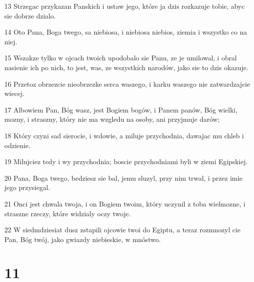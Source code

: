 \par 13 Strzegac przykazan Panskich i ustaw jego, które ja dzis rozkazuje tobie, abyc sie dobrze dzialo.
\par 14 Oto Pana, Boga twego, sa niebiosa, i niebiosa niebios, ziemia i wszystko co na niej.
\par 15 Wszakze tylko w ojcach twoich upodobalo sie Panu, ze je umilowal, i obral nasienie ich po nich, to jest, was, ze wszystkich narodów, jako sie to dzis okazuje.
\par 16 Przetoz obrzezcie nieobrzezke serca waszego, i karku waszego nie zatwardzajcie wiecej.
\par 17 Albowiem Pan, Bóg wasz, jest Bogiem bogów, i Panem panów, Bóg wielki, mozny, i straszny, który nie ma wzgledu na osoby, ani przyjmuje darów;
\par 18 Który czyni sad sierocie, i wdowie, a miluje przychodnia, dawajac mu chleb i odzienie.
\par 19 Milujciez tedy i wy przychodnia; boscie przychodniami byli w ziemi Egipskiej.
\par 20 Pana, Boga twego, bedziesz sie bal, jemu sluzyl, przy nim trwal, i przez imie jego przysiegal.
\par 21 Onci jest chwala twoja, i on Bogiem twoim, który uczynil z toba wielmozne, i straszne rzeczy, które widzialy oczy twoje.
\par 22 W siedmdziesiat dusz zstapili ojcowie twoi do Egiptu, a teraz rozmnozyl cie Pan, Bóg twój, jako gwiazdy niebieskie, w mnóstwo.

\chapter{11}

